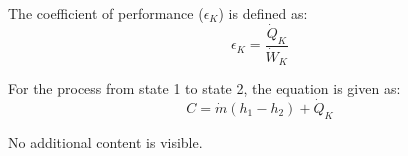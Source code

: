 The coefficient of performance (\( \epsilon_K \)) is defined as:  
\[
\epsilon_K = \frac{\dot{Q}_K}{\dot{W}_K}
\]  

For the process from state 1 to state 2, the equation is given as:  
\[
C = \dot{m} (h_1 - h_2) + \dot{Q}_K
\]  

No additional content is visible.